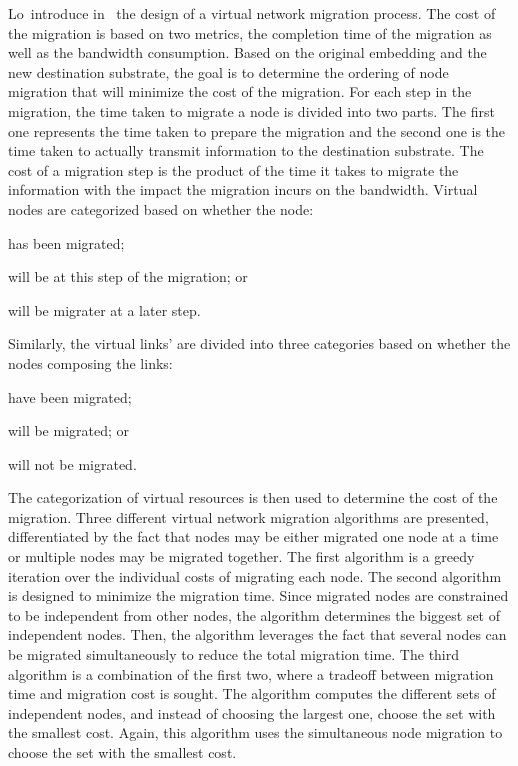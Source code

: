Lo~\etal introduce in~\cite{vnm-lo2013} the design of a virtual network migration process.
The cost of the migration is based on two metrics, the completion time of the migration as well as the bandwidth consumption.
Based on the original embedding and the new destination substrate, the goal is to determine the ordering of node migration that will minimize the cost of the migration.
For each step in the migration, the time taken to migrate a node is divided into two parts. The first one represents the time taken to prepare the migration and the second one is the time taken to actually transmit information to the destination substrate.
The cost of a migration step is the product of the time it takes to migrate the information with the impact the migration incurs on the bandwidth.
Virtual nodes are categorized based on whether the node:
\begin{inparaenum}[i)] 
\item has been migrated;
\item will be at this step of the migration; or 
\item will be migrater at a later step.
\end{inparaenum}
Similarly, the virtual links' are divided into three categories based on whether the nodes composing the links:
\begin{inparaenum}
\item have been migrated;
\item will be migrated; or 
\item will not be migrated.
\end{inparaenum}
The categorization of virtual resources is then used to determine the cost of the migration.
Three different virtual network migration algorithms are presented, differentiated by the fact that nodes may be either migrated one node at a time or multiple nodes may be migrated together.
The first algorithm is a greedy iteration over the individual costs of migrating each node.
The second algorithm is designed to minimize the migration time. Since migrated nodes are constrained to be independent from other nodes, the algorithm determines the biggest set of independent nodes.
Then, the algorithm leverages the fact that several nodes can be migrated simultaneously to reduce the total migration time.
The third algorithm is a combination of the first two, where a tradeoff between migration time and migration cost is sought. The algorithm computes the different sets of independent nodes, and instead of choosing the largest one, choose the set with the smallest cost.
Again, this algorithm uses the simultaneous node migration to choose the set with the smallest cost.

